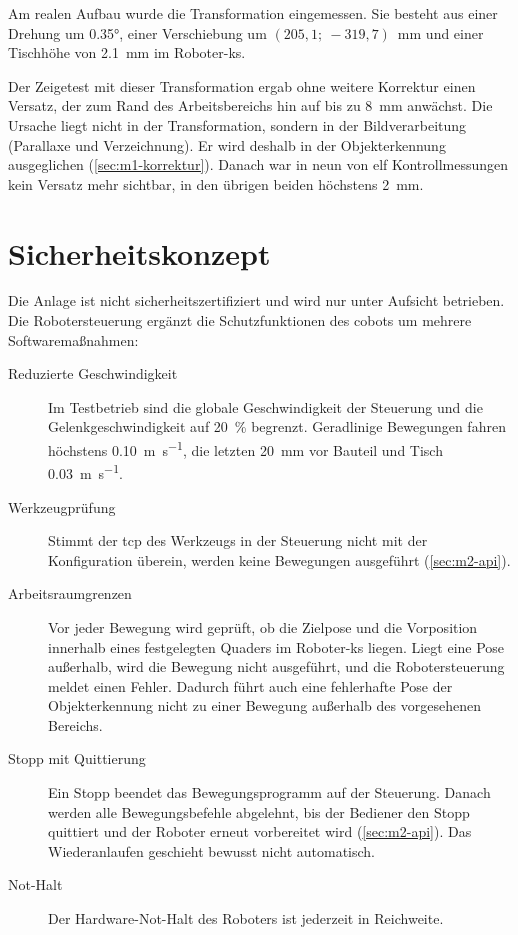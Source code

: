 Am realen Aufbau wurde die Transformation eingemessen. Sie besteht aus einer Drehung um
\ang{0.35}, einer Verschiebung um $(205{,}1;\ -319{,}7)$~\si{\milli\metre} und einer Tischhöhe
von \SI{2,1}{\milli\metre} im Roboter-\ac{ks}.

Der Zeigetest mit dieser Transformation ergab ohne weitere Korrektur einen Versatz, der zum Rand
des Arbeitsbereichs hin auf bis zu \SI{8}{\milli\metre} anwächst. Die Ursache liegt nicht in der
Transformation, sondern in der Bildverarbeitung (Parallaxe und Verzeichnung). Er wird deshalb
in der Objekterkennung ausgeglichen (\cref{sec:m1-korrektur}). Danach war in neun von elf
Kontrollmessungen kein Versatz mehr sichtbar, in den übrigen beiden höchstens
\SI{2}{\milli\metre}.


\section{Sicherheitskonzept}
\label{sec:m2-sicherheit}

Die Anlage ist nicht sicherheitszertifiziert und wird nur unter Aufsicht betrieben. Die
Robotersteuerung ergänzt die Schutzfunktionen des \ac{cobot}s um mehrere
Softwaremaßnahmen:

\begin{description}
  \item[Reduzierte Geschwindigkeit] Im Testbetrieb sind die globale Geschwindigkeit der
    Steuerung und die Gelenkgeschwindigkeit auf \SI{20}{\percent} begrenzt. Geradlinige
    Bewegungen fahren höchstens \SI{0.10}{\metre\per\second}, die letzten
    \SI{20}{\milli\metre} vor Bauteil und Tisch \SI{0.03}{\metre\per\second}.
  \item[Werkzeugprüfung] Stimmt der \ac{tcp} des Werkzeugs in der Steuerung nicht mit der
    Konfiguration überein, werden keine Bewegungen ausgeführt (\cref{sec:m2-api}).
  \item[Arbeitsraumgrenzen] Vor jeder Bewegung wird geprüft, ob die Zielpose und die
    Vorposition innerhalb eines festgelegten Quaders im Roboter-\ac{ks} liegen. Liegt eine
    Pose außerhalb, wird die Bewegung nicht ausgeführt, und die Robotersteuerung meldet einen
    Fehler. Dadurch führt auch eine fehlerhafte Pose der Objekterkennung nicht zu einer
    Bewegung außerhalb des vorgesehenen Bereichs.
  \item[Stopp mit Quittierung] Ein Stopp beendet das Bewegungsprogramm auf der Steuerung.
    Danach werden alle Bewegungsbefehle abgelehnt, bis der Bediener den Stopp quittiert und
    der Roboter erneut vorbereitet wird (\cref{sec:m2-api}). Das Wiederanlaufen geschieht
    bewusst nicht automatisch.
  \item[Not-Halt] Der Hardware-Not-Halt des Roboters ist jederzeit in Reichweite.
\end{description}

